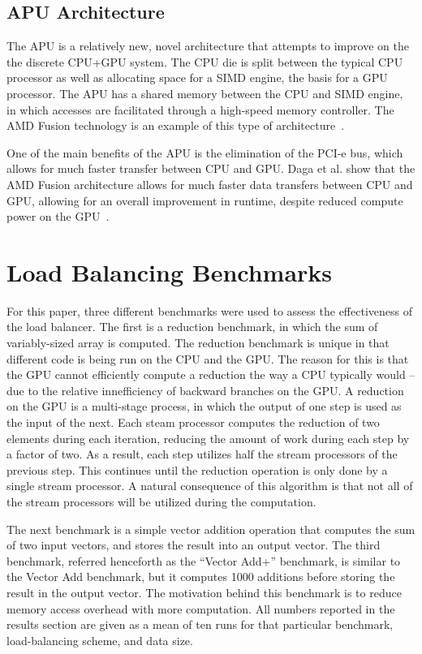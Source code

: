 \documentclass[journal]{IEEEtran}
\begin{document}
\subsection{APU Architecture}
The APU is a relatively new, novel architecture that attempts to 
improve on the the discrete CPU+GPU system.  The CPU die is split
between the typical CPU processor as well as allocating space
for a SIMD engine, the basis for a GPU processor.  The APU has a 
shared memory between the CPU and SIMD engine, in which accesses
are facilitated through a high-speed memory controller.  The AMD
Fusion technology is an example of this type of architecture~\cite{AMDFusion}.

One of the main benefits of the APU is the elimination of the PCI-e
bus, which allows for much faster transfer between CPU and GPU.  Daga et al.
show that the AMD Fusion architecture allows for much faster data transfers
between CPU and GPU, allowing for an overall improvement in runtime, despite
reduced compute power on the GPU~\cite{Daga2011}. 

\section{Load Balancing Benchmarks}

For this paper, three different benchmarks were used to assess the
effectiveness of the load balancer.  The first is a reduction benchmark,
in which the sum of variably-sized array is computed.  The reduction benchmark
is unique in that different code is being run on the CPU and the GPU.  The
reason for this is that the GPU cannot efficiently compute a reduction the way
a CPU typically would -- due to the relative innefficiency of backward branches
on the GPU.  A reduction on the GPU is a multi-stage process, in which the
output of one step is used as the input of the next.  Each steam processor
computes the reduction of two elements during each iteration, reducing the amount
of work during each step by a factor of two.  As a result, each step utilizes half
the stream processors of the previous step.  This continues until the reduction
operation is only done by a single stream processor.  A natural consequence of
this algorithm is that not all of the stream processors will be utilized during
the computation.

The next benchmark is a simple vector addition operation that computes the sum
of two input vectors, and stores the result into an output vector.  The third
benchmark, referred henceforth as the ``Vector Add+'' benchmark, is similar to
the Vector Add benchmark, but it computes 1000 additions before storing the result
in the output vector.  The motivation behind this benchmark is to reduce memory
access overhead with more computation.  All numbers reported in the results section
are given as a mean of ten runs for that particular benchmark, load-balancing scheme,
and data size.
\end{document}
